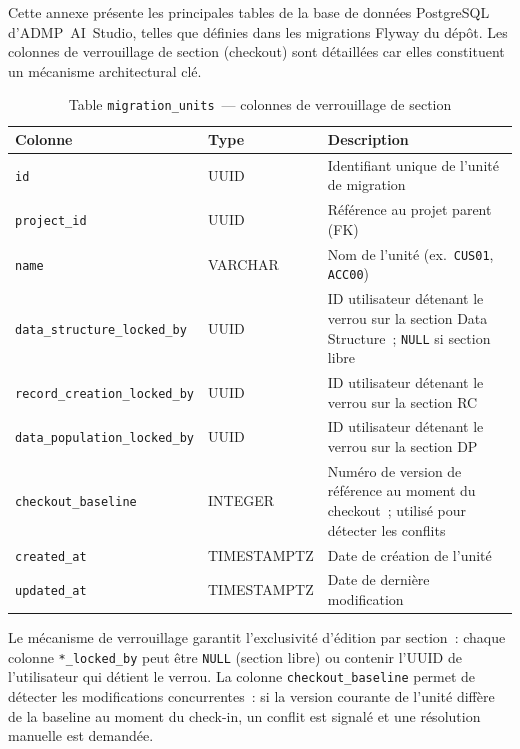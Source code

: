 
Cette annexe présente les principales tables de la base de données PostgreSQL d'ADMP~AI~Studio, telles que définies dans les migrations Flyway du dépôt. Les colonnes de verrouillage de section (checkout) sont détaillées car elles constituent un mécanisme architectural clé.

\begin{table}[H]
\centering
\caption{Table \texttt{migration\_units}~--- colonnes de verrouillage de section}
\label{tab:migration-units-lock}
\begin{tabularx}{\textwidth}{llX}
\toprule
\textbf{Colonne} & \textbf{Type} & \textbf{Description} \\
\midrule
\texttt{id} & UUID & Identifiant unique de l'unité de migration \\
\texttt{project\_id} & UUID & Référence au projet parent (FK) \\
\texttt{name} & VARCHAR & Nom de l'unité (ex.~\texttt{CUS01}, \texttt{ACC00}) \\
\texttt{data\_structure\_locked\_by} & UUID & ID utilisateur détenant le verrou sur la section Data Structure~; \texttt{NULL} si section libre \\
\texttt{record\_creation\_locked\_by} & UUID & ID utilisateur détenant le verrou sur la section RC \\
\texttt{data\_population\_locked\_by} & UUID & ID utilisateur détenant le verrou sur la section DP \\
\texttt{checkout\_baseline} & INTEGER & Numéro de version de référence au moment du checkout~; utilisé pour détecter les conflits \\
\texttt{created\_at} & TIMESTAMPTZ & Date de création de l'unité \\
\texttt{updated\_at} & TIMESTAMPTZ & Date de dernière modification \\
\bottomrule
\end{tabularx}
\end{table}

Le mécanisme de verrouillage garantit l'exclusivité d'édition par section~: chaque colonne \texttt{*\_locked\_by} peut être \texttt{NULL} (section libre) ou contenir l'UUID de l'utilisateur qui détient le verrou. La colonne \texttt{checkout\_baseline} permet de détecter les modifications concurrentes~: si la version courante de l'unité diffère de la baseline au moment du check-in, un conflit est signalé et une résolution manuelle est demandée.
